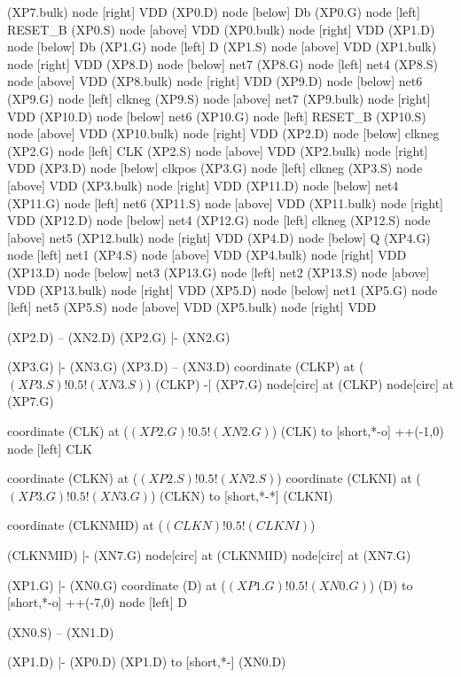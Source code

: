 \begin{circuitikz}[american]
	(XP7.bulk) node [right]	{VDD}
	(XP0.D) node [below]	{Db}
	(XP0.G) node [left]	{RESET\_B}
	(XP0.S) node [above]	{VDD}
	(XP0.bulk) node [right]	{VDD}
	(XP1.D) node [below]	{Db}
	(XP1.G) node [left]	{D}
	(XP1.S) node [above]	{VDD}
	(XP1.bulk) node [right]	{VDD}
	(XP8.D) node [below]	{net7}
	(XP8.G) node [left]	{net4}
	(XP8.S) node [above]	{VDD}
	(XP8.bulk) node [right]	{VDD}
	(XP9.D) node [below]	{net6}
	(XP9.G) node [left]	{clkneg}
	(XP9.S) node [above]	{net7}
	(XP9.bulk) node [right]	{VDD}
	(XP10.D) node [below]	{net6}
	(XP10.G) node [left]	{RESET\_B}
	(XP10.S) node [above]	{VDD}
	(XP10.bulk) node [right]	{VDD}
	(XP2.D) node [below]	{clkneg}
	(XP2.G) node [left]	{CLK}
	(XP2.S) node [above]	{VDD}
	(XP2.bulk) node [right]	{VDD}
	(XP3.D) node [below]	{clkpos}
	(XP3.G) node [left]	{clkneg}
	(XP3.S) node [above]	{VDD}
	(XP3.bulk) node [right]	{VDD}
	(XP11.D) node [below]	{net4}
	(XP11.G) node [left]	{net6}
	(XP11.S) node [above]	{VDD}
	(XP11.bulk) node [right]	{VDD}
	(XP12.D) node [below]	{net4}
	(XP12.G) node [left]	{clkneg}
	(XP12.S) node [above]	{net5}
	(XP12.bulk) node [right]	{VDD}
	(XP4.D) node [below]	{Q}
	(XP4.G) node [left]	{net1}
	(XP4.S) node [above]	{VDD}
	(XP4.bulk) node [right]	{VDD}
	(XP13.D) node [below]	{net3}
	(XP13.G) node [left]	{net2}
	(XP13.S) node [above]	{VDD}
	(XP13.bulk) node [right]	{VDD}
	(XP5.D) node [below]	{net1}
	(XP5.G) node [left]	{net5}
	(XP5.S) node [above]	{VDD}
	(XP5.bulk) node [right]	{VDD}
\fi


	(XP2.D) -- (XN2.D)
	(XP2.G) |- (XN2.G)
	
	(XP3.G) |- (XN3.G)
	(XP3.D) -- (XN3.D)
	coordinate (CLKP) at ($(XP3.S)!0.5!(XN3.S)$)
	(CLKP) -| (XP7.G)
	node[circ] at (CLKP) {}
	node[circ] at (XP7.G) {}
	
	coordinate (CLK) at ($(XP2.G)!0.5!(XN2.G)$)
	(CLK) to [short,*-o] ++(-1,0) node [left] {CLK}
	
	coordinate (CLKN) at ($(XP2.S)!0.5!(XN2.S)$)
	coordinate (CLKNI) at ($(XP3.G)!0.5!(XN3.G)$)
	(CLKN) to [short,*-*] (CLKNI)
	
	coordinate (CLKNMID) at ($(CLKN)!0.5!(CLKNI)$)
	
	(CLKNMID) |- (XN7.G)
	node[circ] at (CLKNMID){}
	node[circ] at (XN7.G){}
	
	(XP1.G) |- (XN0.G)
	coordinate (D) at ($(XP1.G)!0.5!(XN0.G)$)
	(D) to [short,*-o] ++(-7,0) node [left] {D}
	
	(XN0.S) -- (XN1.D) 
	
	(XP1.D) |- (XP0.D)
	(XP1.D) to [short,*-] (XN0.D)
	

\end{circuitikz}
